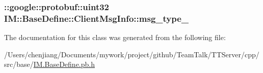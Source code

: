 \subsubsection[{msg\+\_\+type\+\_\+}]{\setlength{\rightskip}{0pt plus 5cm}\+::google\+::protobuf\+::uint32 I\+M\+::\+Base\+Define\+::\+Client\+Msg\+Info\+::msg\+\_\+type\+\_\+\hspace{0.3cm}{\ttfamily [private]}}\label{class_i_m_1_1_base_define_1_1_client_msg_info_a65eb6948b9dcf595e7adebe3ebd1d3a0}


The documentation for this class was generated from the following file\+:\begin{DoxyCompactItemize}
\item 
/\+Users/chenjiang/\+Documents/mywork/project/github/\+Team\+Talk/\+T\+T\+Server/cpp/src/base/\hyperlink{_i_m_8_base_define_8pb_8h}{I\+M.\+Base\+Define.\+pb.\+h}\end{DoxyCompactItemize}
